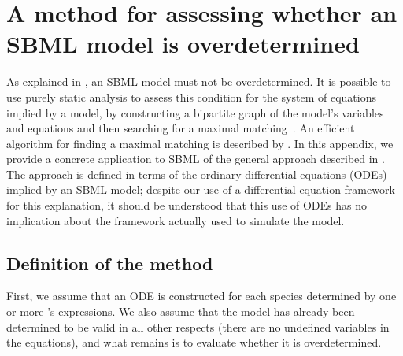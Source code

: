 
\section{A method for assessing whether an SBML model is overdetermined}
\label{apdx:assessing-overdetermined}

As explained in , an SBML model
must not be overdetermined.  It is possible to use purely static
analysis to assess this condition for the system of equations implied by a
model, by constructing a bipartite graph of the model's variables
and equations and then searching for a maximal
matching~\citep{chartrand_1977}.  An efficient algorithm for finding
a maximal matching is described by \cite{hopcroft:1973}.  In this
appendix, we provide a concrete application to SBML of the general
approach described in .  The
approach is defined in terms of the ordinary differential
equations (ODEs) implied by an SBML model; 
despite our use of a differential equation framework for
  this explanation, it should be understood that this
use of ODEs has no implication about the framework
  actually used to simulate the model.


\subsection*{Definition of the method}
\label{sec:overdetermined-method}

First, we assume that an ODE is constructed for each species
determined by one or more \Reaction's \KineticLaw {}
expressions.  We also assume that the model has already been
determined to be valid in all other respects (\eg there are no
undefined variables in the equations), and what remains is to
evaluate whether it is overdetermined.

